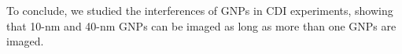 \documentclass[aps,prb,reprint,groupedaddress, superscriptaddress]{revtex4-1}
\begin{document}
To conclude, we studied the interferences of GNPs in CDI experiments, showing that 10-nm and 40-nm GNPs can be imaged as long as more than one GNPs are imaged. 



%


\end{document}
